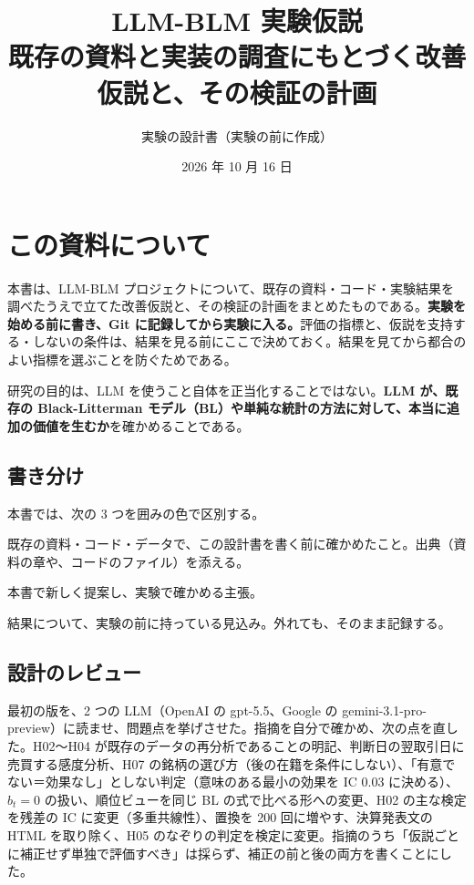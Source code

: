 \documentclass[xelatex,ja=standard,jafont=haranoaji,a4paper,10pt,openany]{bxjsreport}
\title{LLM-BLM 実験仮説\\[6pt]
  \large 既存の資料と実装の調査にもとづく改善仮説と、その検証の計画}
\author{実験の設計書（実験の前に作成）}
\date{2026 年 10 月 16 日}
\begin{document}
\maketitle
\setcounter{tocdepth}{1}
{\small\tableofcontents}

\chapter*{この資料について}

本書は、LLM-BLM プロジェクトについて、既存の資料・コード・実験結果を調べたうえで立てた改善仮説と、その検証の計画をまとめたものである。\textbf{実験を始める前に書き、Git に記録してから実験に入る。}評価の指標と、仮説を支持する・しないの条件は、結果を見る前にここで決めておく。結果を見てから都合のよい指標を選ぶことを防ぐためである。

研究の目的は、LLM を使うこと自体を正当化することではない。\textbf{LLM が、既存の Black-Litterman モデル（BL）や単純な統計の方法に対して、本当に追加の価値を生むか}を確かめることである。

\section*{書き分け}

本書では、次の 3 つを囲みの色で区別する。

\begin{factbox}[資料で確認した事実（緑）]
既存の資料・コード・データで、この設計書を書く前に確かめたこと。出典（資料の章や、コードのファイル）を添える。
\end{factbox}
\begin{hypbox}[新しく立てる仮説（紫）]
本書で新しく提案し、実験で確かめる主張。
\end{hypbox}
\begin{predbox}[実験前の予想（黄）]
結果について、実験の前に持っている見込み。外れても、そのまま記録する。
\end{predbox}

\section*{設計のレビュー}

最初の版を、2 つの LLM（OpenAI の gpt-5.5、Google の gemini-3.1-pro-preview）に読ませ、問題点を挙げさせた。指摘を自分で確かめ、次の点を直した。H02〜H04 が既存のデータの再分析であることの明記、判断日の翌取引日に売買する感度分析、H07 の銘柄の選び方（後の在籍を条件にしない）、「有意でない＝効果なし」としない判定（意味のある最小の効果を IC 0.03 に決める）、$b_t=0$ の扱い、順位ビューを同じ BL の式で比べる形への変更、H02 の主な検定を残差の IC に変更（多重共線性）、置換を 200 回に増やす、決算発表文の HTML を取り除く、H05 のなぞりの判定を検定に変更。指摘のうち「仮説ごとに補正せず単独で評価すべき」は採らず、補正の前と後の両方を書くことにした。
\end{document}
